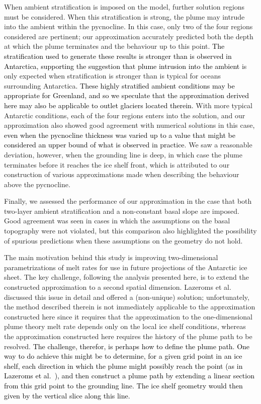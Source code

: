 \documentclass[openacc]{rsproca_new}%
\newcommand{\red}[1]{{\color{red} #1}}
\newcommand{\blue}[1]{{\color{blue} #1}}
\newcommand{\rout}[1]{\red{\st{#1}}}\newcommand{\ab}[1]{\textcolor{Green}{#1}}\newcommand{\about}[1]{\textcolor{Cyan}{\sout{#1}}}
\renewcommand{\rout}[1]{{}} %
\renewcommand{\blue}[1]{{\textcolor{black}{#1}}} %
\renewcommand{\red}[1]{{}} %
\begin{document}
When ambient stratification is imposed on the model, further solution regions must be considered. When this stratification is strong, the plume may intrude into the ambient within the pycnocline. In this case, only two of the four regions considered are pertinent; our approximation accurately predicted both the depth at which the plume terminates and the behaviour up to this point. \blue{The stratification used to generate these results is stronger than is observed in Antarctica, supporting the suggestion that plume intrusion into the ambient}\rout{ This behaviour} is only expected when stratification is stronger than is typical for oceans surrounding Antarctica\blue{. These highly stratified ambient conditions may be appropriate for Greenland, and so we speculate  that the approximation derived here may also be applicable to outlet glaciers located therein.} With more typical Antarctic conditions, each of the four regions enters into the solution, and our approximation also showed good agreement with numerical solutions in this case\blue{, even when the pycnocline thickness was varied up to a value that might be considered an upper bound of what is observed in practice}. We saw a reasonable deviation, however, when the grounding line is deep, in which case the plume terminates before it reaches the ice shelf front, which is attributed to our construction of various approximations made when describing the behaviour above the pycnocline.

Finally, we assessed the performance of our approximation in the case that both two-layer ambient stratification and a non-constant basal slope are imposed. Good agreement was seen in cases in which the assumptions on the basal topography were not violated, but this comparison also highlighted the possibility of spurious predictions when these assumptions on the geometry do not hold.

%
The main motivation behind this study is improving two-dimensional parametrizations of melt rates for use in future projections of the Antarctic ice sheet. The key challenge, following the analysis presented here, is to extend the constructed approximation to a second spatial dimension. \rout{Whilst this is beyond the scope of this paper, it should be noted that this presents a significant challenge.} Lazeroms et al.~\cite{Lazeroms2018TheCryo} discussed this issue in detail and offered a (non-unique) solution; unfortunately, the method described therein is not immediately applicable to the approximation constructed here since it requires that the approximation to the one-dimensional plume theory melt rate depends only on the local ice shelf conditions, whereas the approximation constructed here requires the history of the plume path to be resolved. \blue{The challenge, therefor, is perhaps how to define the plume path. One way to do achieve this might be to determine, for a given grid point in an ice shelf, each direction in which the plume might possibly reach the point (as in Lazeroms et al.~\cite{Lazeroms2018TheCryo}), and then construct a plume path by extending a linear section from this grid point to the grounding line. The ice shelf geometry would then given by the vertical slice along this line. }
\end{document}
